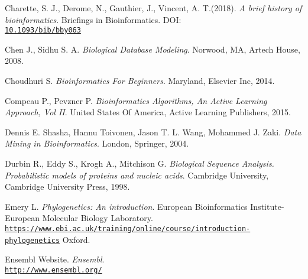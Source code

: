 \documentclass[twoside,openright,titlepage,fleqn,
,	headinclude,12pt,a4paper,BCOR5mm,footinclude,table]{scrbook}
\newcommand{\?}{'\-\nobreak\hspace{0pt}}
\begin{document}
\begin{thebibliography}{60}
Charette, S. J., Derome, N., Gauthier, J., Vincent, A. T.(2018). \newline
\textit{A brief history of bioinformatics}. \newline
Briefings in Bioinformatics.\newline
DOI: \\\texttt{\url{10.1093/bib/bby063}}

Chen J., Sidhu S. A.\newline
\textit{Biological Database Modeling}.\newline
Norwood, MA, Artech House, 2008.

Choudhuri S. \newline
\textit{Bioinformatics For Beginners}. \newline
Maryland, Elsevier Inc, 2014.

Compeau P., Pevzner P. \newline
\textit{Bioinformatics Algorithms, An Active Learning Approach, Vol II}. \newline
United States Of America, Active Learning Publishers, 2015.

Dennis E. Shasha, Hannu Toivonen, Jason T. L. Wang, Mohammed J. Zaki. \newline
\textit{Data Mining in Bioinformatics}.\newline
London, Springer, 2004.

Durbin R., Eddy S., Krogh A., Mitchison G.\newline
\textit{Biological Sequence Analysis. Probabilistic models of proteins and nucleic acids}.\newline
Cambridge University, Cambridge University Press, 1998.

Emery L.\newline
\textit{Phylogenetics: An introduction}.\newline
European Bioinformatics Institute-European Molecular Biology Laboratory.
\\\texttt{\url{https://www.ebi.ac.uk/training/online/course/introduction-phylogenetics}}\newline
Oxford.

Ensembl Website.\newline
\textit{Ensembl}.
\\\texttt{\url{http://www.ensembl.org/}}


\end{thebibliography}
\end{document}
